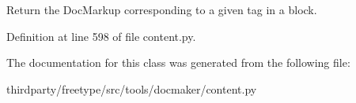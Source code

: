 \begin{DoxyVerb}Return the DocMarkup corresponding to a given tag in a block.\end{DoxyVerb}
 

Definition at line 598 of file content.\+py.



The documentation for this class was generated from the following file\+:\begin{DoxyCompactItemize}
\item 
thirdparty/freetype/src/tools/docmaker/content.\+py\end{DoxyCompactItemize}
